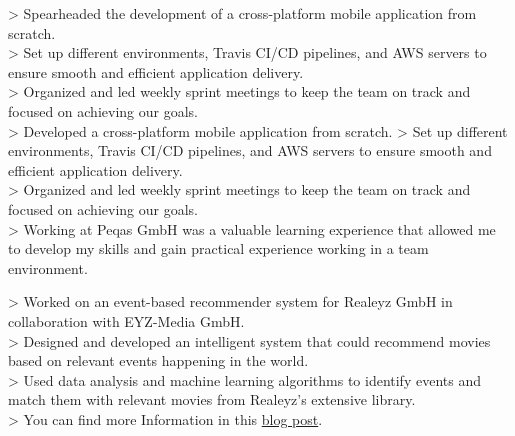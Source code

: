 \documentclass[10pt,a4paper,normalphoto]{altacv}
\begin{document}
\begin{fullwidth}
\vspace{1em}


\vspace{2em}

> Spearheaded the development of a cross-platform mobile application from scratch.\\
> Set up different environments, Travis CI/CD pipelines, and AWS servers to ensure smooth and efficient application delivery.\\
> Organized and led weekly sprint meetings to keep the team on track and focused on achieving our goals.\\
> Developed a cross-platform mobile application from scratch.
> Set up different environments, Travis CI/CD pipelines, and AWS servers to ensure smooth and efficient application delivery.\\
> Organized and led weekly sprint meetings to keep the team on track and focused on achieving our goals.\\
> Working at Peqas GmbH was a valuable learning experience that allowed me to develop my skills and gain practical experience working in a team environment.

\vspace{1em}


\vspace{2em}

> Worked on an event-based recommender system for Realeyz GmbH in collaboration with EYZ-Media GmbH.\\
> Designed and developed an intelligent system that could recommend movies based on relevant events happening in the world.\\
> Used data analysis and machine learning algorithms to identify events and match them with relevant movies from Realeyz's extensive library.\\
> You can find more Information in this \href{https://eyzmedia.de/en/event-based-approach/}{blog post}.


\end{fullwidth}
\end{document}

